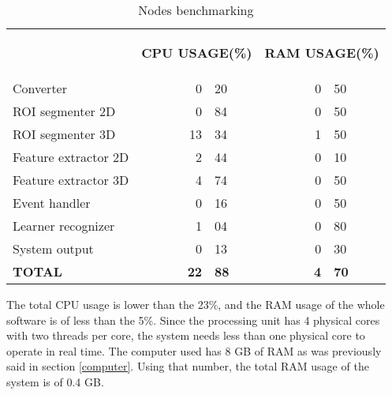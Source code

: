 \begin{table}[H]
\centering
\begin{tabular} {l c r@{.}l c r@{.}l }%
\toprule
\addlinespace[3mm]
   \multicolumn{1}{c}{\begin{center}\textbf{NODES}\end{center}} &
   \multicolumn{3}{c}{\begin{center}\textbf{CPU USAGE(\%)}\end{center}} &
   \multicolumn{3}{c}{\begin{center}\textbf{RAM USAGE(\%)}\end{center}} &\\
\addlinespace[-3mm]
\midrule
Converter && %
0&20 && 0&50 \\
ROI segmenter 2D && %
0&84 && 0&50\\
ROI segmenter 3D && %
 13&34 && 1&50\\
Feature extractor 2D && %
2&44 && 0&10\\
Feature extractor 3D && %
 4&74 && 0&50\\
Event handler && %
0&16 && 0&50 \\
Learner recognizer &&%
1&04 && 0&80 \\
System output && %
0&13 && 0&30 \\
\textbf{TOTAL} && %
\textbf{22}&\textbf{88} && \textbf{4}&\textbf{70} \\
\bottomrule
\end{tabular}
\caption{Nodes benchmarking}
\label{node}

\end{table}




			The total CPU usage is lower than the 23\%, and the RAM usage of the whole software is of less than the 5\%. 
			Since the processing unit has 4 physical cores with two threads per core, the system needs less than one physical core to operate in real time. %
			The computer used has 8 GB of RAM as was previously said in section \ref{computer}. 
			Using that number, the total RAM usage of the system is of 0.4 GB. 
			\\


